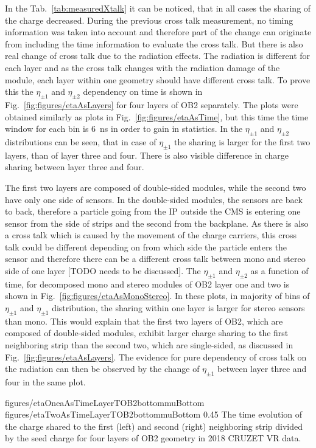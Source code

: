 In the Tab.~\ref{tab:measuredXtalk} it can be noticed, that in all cases the sharing of the charge decreased. During the previous cross talk measurement, no timing information was taken into account and therefore part of the change can originate from including the time information to evaluate the cross talk. But there is also real change of cross talk due to the radiation effects. The radiation is different for each layer and as the cross talk changes with the radiation damage of the module, each layer within one geometry should have different cross talk. To prove this the $\eta_{\pm 1}$ and $\eta_{\pm 2}$ dependency on time is shown in Fig.~\ref{fig:figures/etaAsLayers} for four layers of OB2 separately. The plots were obtained similarly as plots in Fig.~\ref{fig:figures/etaAsTime}, but this time the time window for each bin is 6~ns in order to gain in statistics. In the $\eta_{\pm 1}$ and $\eta_{\pm 2}$ distributions can be seen, that in  case of $\eta_{\pm 1}$ the sharing is larger for the first two layers, than of layer three and four. There is also visible difference in charge sharing between layer three and four. 

The first two layers are composed of double-sided modules, while the second two have only one side of sensors. In the double-sided modules, the sensors are back to back, therefore a particle going from the IP outside the CMS is entering one sensor from the side of strips and the second from the backplane. As there is also a cross talk which is caused by the movement of the charge carriers, this cross talk could be different depending on from which side the particle enters the sensor and therefore there can be a different cross talk between mono and stereo side of one layer [TODO needs to be discussed]. The $\eta_{\pm 1}$ and $\eta_{\pm 2}$ as a function of time, for decomposed mono and stereo modules of OB2 layer one and two is shown in Fig.~\ref{fig:figures/etaAsMonoStereo}. In these plots, in majority of bins of $\eta_{\pm 1}$ and $\eta_{\pm 1}$  distribution, the sharing within one layer is larger for stereo sensors than mono. This would explain that the first two layers of OB2, which are composed of double-sided modules, exhibit larger charge sharing to the first neighboring strip than the second two, which are single-sided, as discussed in Fig.~\ref{fig:figures/etaAsLayers}. The evidence for pure dependency of cross talk on the radiation can then be observed by the change of $\eta_{\pm 1}$ between layer three and four in the same plot.


                 {figures/etaOneaAsTimeLayerTOB2bottommuBottom}
                 {figures/etaTwoAsTimeLayerTOB2bottommuBottom} %
                 {0.45}       %
                 { The time evolution of the charge shared to the first (left) and second (right) neighboring strip divided by the seed charge for four layers of OB2 geometry in 2018 CRUZET VR data.}


